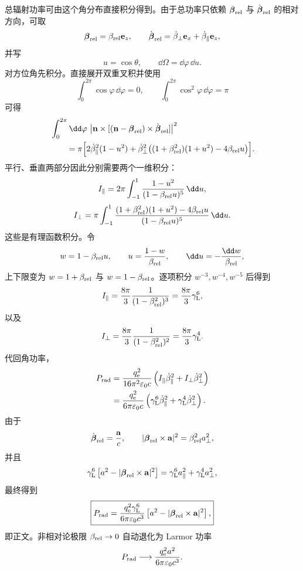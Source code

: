 \begin{derivation}[远区角通量积分与总辐射功率]
总辐射功率可由这个角分布直接积分得到。由于总功率只依赖 \(\boldsymbol\beta_{\rm rel}\) 与 \(\dot{\boldsymbol\beta}_{\rm rel}\) 的相对方向，可取
\[
\boldsymbol\beta_{\rm rel}
=
\beta_{\rm rel}\mathbf e_z,
\qquad
\dot{\boldsymbol\beta}_{\rm rel}
=
\dot\beta_\perp\mathbf e_x
+
\dot\beta_\parallel\mathbf e_z,
\]
并写
\[
u=\cos\theta,
\qquad
\dd\Omega=\dd\varphi\,\dd u.
\]
对方位角先积分。直接展开双重叉积并使用
\[
\int_0^{2\pi}\cos\varphi\,\dd\varphi=0,
\qquad
\int_0^{2\pi}\cos^2\varphi\,\dd\varphi=\pi
\]
可得
\begin{align*}
&\int_0^{2\pi}\dd\varphi\,
\left|
\mathbf n\times[
(\mathbf n-\boldsymbol\beta_{\rm rel})
\times\dot{\boldsymbol\beta}_{\rm rel}]
\right|^2\\
&\qquad=
\pi\Bigl[
2\dot\beta_\parallel^2(1-u^2)
+
\dot\beta_\perp^2
\bigl((1+\beta_{\rm rel}^2)(1+u^2)-4\beta_{\rm rel}u\bigr)
\Bigr].
\end{align*}
平行、垂直两部分因此分别需要两个一维积分：
\[
I_\parallel
=
2\pi
\int_{-1}^{1}
\frac{1-u^2}{(1-\beta_{\rm rel}u)^5}\,\dd u,
\]
\[
I_\perp
=
\pi
\int_{-1}^{1}
\frac{
(1+\beta_{\rm rel}^2)(1+u^2)-4\beta_{\rm rel}u
}
{(1-\beta_{\rm rel}u)^5}\,\dd u.
\]
这些是有理函数积分。令
\[
w=1-\beta_{\rm rel}u,
\qquad
u=\frac{1-w}{\beta_{\rm rel}},
\qquad
\dd u=-\frac{\dd w}{\beta_{\rm rel}},
\]
上下限变为 \(w=1+\beta_{\rm rel}\) 与
\(w=1-\beta_{\rm rel}\)。逐项积分 \(w^{-3},w^{-4},w^{-5}\) 后得到
\[
I_\parallel
=
\frac{8\pi}{3}
\frac1{(1-\beta_{\rm rel}^2)^3}
=
\frac{8\pi}{3}\gamma_{\rm L}^6,
\]
以及
\[
I_\perp
=
\frac{8\pi}{3}
\frac1{(1-\beta_{\rm rel}^2)^2}
=
\frac{8\pi}{3}\gamma_{\rm L}^4.
\]
代回角功率，
\begin{align*}
P_{\rm rad}
&=
\frac{q_{\mathrm e}^2}{16\pi^2\varepsilon_0c}
\left(
I_\parallel\dot\beta_\parallel^2
+
I_\perp\dot\beta_\perp^2
\right)\\
&=
\frac{q_{\mathrm e}^2}{6\pi\varepsilon_0c}
\left(
\gamma_{\rm L}^6\dot\beta_\parallel^2
+
\gamma_{\rm L}^4\dot\beta_\perp^2
\right).
\end{align*}
由于
\[
\dot{\boldsymbol\beta}_{\rm rel}
=
\frac{\mathbf a}{c},
\qquad
|\boldsymbol\beta_{\rm rel}\times\mathbf a|^2
=
\beta_{\rm rel}^2a_\perp^2,
\]
并且
\[
\gamma_{\rm L}^6
\left[
a^2-
|\boldsymbol\beta_{\rm rel}\times\mathbf a|^2
\right]
=
\gamma_{\rm L}^6a_\parallel^2
+
\gamma_{\rm L}^4a_\perp^2,
\]
最终得到
\[
\boxed{
P_{\rm rad}
=
\frac{q_{\mathrm e}^2\gamma_{\rm L}^6}
{6\pi\varepsilon_0c^3}
\left[
a^2-
|\boldsymbol\beta_{\rm rel}\times\mathbf a|^2
\right],
}
\]
即正文。非相对论极限
\(\beta_{\rm rel}\to0\) 自动退化为 Larmor 功率
\[
P_{\rm rad}
\longrightarrow
\frac{q_{\mathrm e}^2a^2}{6\pi\varepsilon_0c^3}.
\]
\end{derivation}

